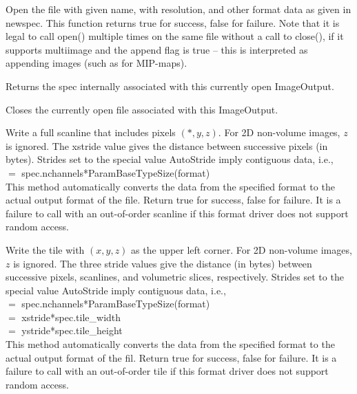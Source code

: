 Open the file with given {\kw name}, with resolution, and other format
data as given in {\kw newspec}.  This function returns {\kw true} for
success, {\kw false} for failure.  Note that it is legal to call {\kw
open()} multiple times on the same file without a call to {\kw
close()}, if it supports multiimage and the append flag is {\kw true}
-- this is interpreted as appending images (such as for MIP-maps).

\apiend

Returns the spec internally associated with this currently open
{\kw ImageOutput}.
\apiend

Closes the currently open file associated with this {\kw ImageOutput}.
\apiend


Write a full scanline that includes pixels $(*,y,z)$.  For 2D non-volume
images, $z$ is ignored.  The {\kw xstride} value gives the distance
between successive pixels (in bytes).  Strides set to the special value
{\kw AutoStride} imply contiguous data, i.e., \\  $=$
{\kw spec.nchannels*ParamBaseTypeSize(format)} \\ This method
automatically converts the data from the specified {\kw format} to the
actual output format of the file.  Return {\kw true} for success, {\kw
  false} for failure.  It is a failure to call \writescanline with an
out-of-order scanline if this format driver does not support random
access.

\apiend


Write the tile with $(x,y,z)$ as the upper left corner.  For 2D
non-volume images, $z$ is ignored.  The three stride values give the
distance (in bytes) between successive pixels, scanlines, and volumetric
slices, respectively.  Strides set to the special value {\kw AutoStride}
imply contiguous data, i.e., \\
 $=$ {\kw spec.nchannels*ParamBaseTypeSize(format)} \\
 $=$ {\kw xstride*spec.tile_width} \\
 $=$ {\kw ystride*spec.tile_height} \\
This method automatically converts the
data from the specified {\kw format} to the actual output format of the
fil.  Return {\kw true} for success, {\kw false} for failure.  It is a
failure to call \writetile with an out-of-order tile if this
format driver does not support random access.

